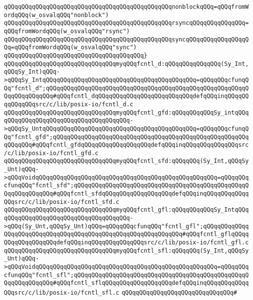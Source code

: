 \verb|qQQqqQQqqQQqqQQqqQQqqQQqqQQqqQQqqQQqqQQqqQQqqQQqnonblockqQQq=qQQqfromWordqQQq(w_osvalqQQq"nonblock")|\newline
\verb|qQQqqQQqqQQqqQQqqQQqqQQqqQQqqQQqqQQqqQQqqQQqqQQqrsyncqQQqqQQqqQQqqQQq=qQQqfromWordqQQq(w_osvalqQQq"rsync")|\newline
\verb|qQQqqQQqqQQqqQQqqQQqqQQqqQQqqQQqqQQqqQQqqQQqqQQqsyncqQQqqQQqqQQqqQQqqQQq=qQQqfromWordqQQq(w_osvalqQQq"sync")|\newline
\verb|qQQqqQQqqQQqqQQqqQQqqQQqqQQqqQQqqQQqqQQq}|\newline
\newline
\verb|qQQqqQQqqQQqqQQqqQQqqQQqqQQqqQQqmyqQQqfcntl_d:qQQqqQQqqQQqqQQq(Sy_Int,qQQqSy_Int)qQQq->qQQqSy_IntqQQqqQQqqQQqqQQqqQQqqQQqqQQqqQQqqQQqqQQqqQQq=qQQqqQQqcfunqQQq"fcntl_d";qQQqqQQqqQQqqQQqqQQqqQQqqQQqqQQqqQQqqQQqqQQqqQQqqQQqqQQqqQQqqQQqqQQqqQQq#qQQqfcntl_dqQQqqQQqqQQqqQQqqQQqqQQqqQQqdefqQQqinqQQqqQQqqQQqqQQqsrc/c/lib/posix-io/fcntl_d.c|\newline
\verb|qQQqqQQqqQQqqQQqqQQqqQQqqQQqqQQqmyqQQqfcntl_gfd:qQQqqQQqqQQqSy_intqQQqqQQqqQQqqQQqqQQqqQQqqQQqqQQqqQQqqQQq->qQQqSy_UntqQQqqQQqqQQqqQQqqQQqqQQqqQQqqQQqqQQqqQQqqQQq=qQQqqQQqcfunqQQq"fcntl_gfd";qQQqqQQqqQQqqQQqqQQqqQQqqQQqqQQqqQQqqQQqqQQqqQQqqQQqqQQqqQQqqQQq#qQQqfcntl_gfdqQQqqQQqqQQqqQQqqQQqdefqQQqinqQQqqQQqqQQqqQQqsrc/c/lib/posix-io/fcntl_gfd.c|\newline
\verb|qQQqqQQqqQQqqQQqqQQqqQQqqQQqqQQqmyqQQqfcntl_sfd:qQQqqQQq(Sy_Int,qQQqSy_Unt)qQQq->qQQqVoidqQQqqQQqqQQqqQQqqQQqqQQqqQQqqQQqqQQqqQQqqQQqqQQqqQQq=qQQqqQQqcfunqQQq"fcntl_sfd";qQQqqQQqqQQqqQQqqQQqqQQqqQQqqQQqqQQqqQQqqQQqqQQqqQQqqQQqqQQqqQQq#qQQqfcntl_sfdqQQqqQQqqQQqqQQqqQQqdefqQQqinqQQqqQQqqQQqqQQqsrc/c/lib/posix-io/fcntl_sfd.c|\newline
\verb|qQQqqQQqqQQqqQQqqQQqqQQqqQQqqQQqmyqQQqfcntl_gfl:qQQqqQQqqQQqSy_IntqQQqqQQqqQQqqQQqqQQqqQQqqQQqqQQqqQQqqQQq->qQQq(Sy_Unt,qQQqSy_Unt)qQQq=qQQqqQQqcfunqQQq"fcntl_gfl";qQQqqQQqqQQqqQQqqQQqqQQqqQQqqQQqqQQqqQQqqQQqqQQqqQQqqQQqqQQqqQQq#qQQqfcntl_gflqQQqqQQqqQQqqQQqqQQqdefqQQqinqQQqqQQqqQQqqQQqsrc/c/lib/posix-io/fcntl_gfl.c|\newline
\verb|qQQqqQQqqQQqqQQqqQQqqQQqqQQqqQQqmyqQQqfcntl_sfl:qQQqqQQq(Sy_Int,qQQqSy_Unt)qQQq->qQQqVoidqQQqqQQqqQQqqQQqqQQqqQQqqQQqqQQqqQQqqQQqqQQqqQQqqQQq=qQQqqQQqcfunqQQq"fcntl_sfl";qQQqqQQqqQQqqQQqqQQqqQQqqQQqqQQqqQQqqQQqqQQqqQQqqQQqqQQqqQQqqQQq#qQQqfcntl_sflqQQqqQQqqQQqqQQqqQQqdefqQQqinqQQqqQQqqQQqqQQqsrc/c/lib/posix-io/fcntl_sfl.c|\newline
\verb|qQQqqQQqqQQqqQQqqQQqqQQqqQQqqQQq#|\newline
